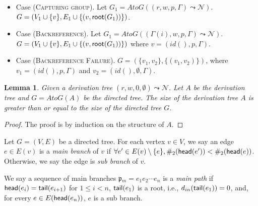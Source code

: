 \documentclass[conference]{IEEEtran}
\newtheorem{lemma}{Lemma}[section]
\newcommand{\togform}{{\mathit AtoG}}
\newcommand{\groot}{{\sf root}}
\newcommand{\indig}{d_{in}}
\newcommand{\tail}{{\sf tail}}
\newcommand{\head}{{\sf head}}
\newcommand{\path}{\mathfrak{p}}
\newcommand{\fresh}{\mathit{id}}
\begin{document}
\begin{itemize}
    \item Case (\textsc{Capturing group}).
    Let $G_1 = \togform{}((r,w,p,\Gamma) \leadsto{} \mathcal{N})$.
    $G = ( V_1 \cup \{ v \}, E_1 \cup \{ (v, \groot{}(G_1)) \} )$.
    
    \item Case (\textsc{Backreference}).
    Let $G_1 = \togform{}((\Gamma(i),w,p,\Gamma)\leadsto{}\mathcal{N})$.
    $G = (V_1 \cup \{ v \} , E_1 \cup \{ (v,\groot{}(G_1)) \})$ where $v = (\fresh(),p,\Gamma)$.
    \item Case (\textsc{Backreference Failure}). $G = (\{v_1, v_2\},\{ (v_1,v_2) \})$, where $v_1 = (\fresh(), p, \Gamma)$ and $v_2 = (\fresh(), \emptyset{}, \Gamma)$.    
\end{itemize}

\begin{lemma}
\label{lem:directediseq}
Given a derivation tree $(r,w,0,\emptyset{}) \leadsto{} \mathcal{N}$.
Let $A$ be the derivation tree and $G = \togform{}(A)$ be the directed tree.
The size of the derivation tree $A$ is greater than or equal to the size of the directed tree $G$.
\end{lemma}
\begin{proof}
The proof is by induction on the structure of $A$.
\end{proof}



\begin{definition}
\normalfont
Let $G = (V,E)$ be a directed tree.
For each vertex $v \in V$, we say an edge $e \in E(v)$ is a {\em main branch} of $v$ if $\forall  e' \in E(v) \setminus \{ e \}, \#_2(\head{}(e')) < \#_2(\head{}(e))$.
Otherwise, we say the edge is {\em sub branch} of $v$. \end{definition}

\begin{definition}
\normalfont
We say a sequence of main branches $\path{}_m = e_1 e_2 \cdots e_n$ is a {\em main path} if $\head{}(e_i) = \tail{}(e_{i+1})$ for $1 \leq i < n$, $\tail{}(e_1)$ is a root, i.e., $\indig{}(\tail{}(e_1)) = 0$, and, for every $e \in E(\head{}(e_{n}))$, $e$ is a sub branch. 
\end{definition}
\end{document}
